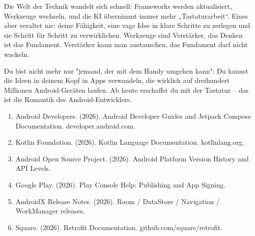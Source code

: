 Die Welt der Technik wandelt sich schnell: Frameworks werden aktualisiert, Werkzeuge wechseln, und die KI übernimmt immer mehr „Tastaturarbeit“. Eines aber veraltet nie: deine Fähigkeit, eine vage Idee in klare Schritte zu zerlegen und sie Schritt für Schritt zu verwirklichen. Werkzeuge sind Verstärker, das Denken ist das Fundament. Verstärker kann man austauschen, das Fundament darf nicht wackeln.

Du bist nicht mehr nur "jemand, der mit dem Handy umgehen kann": Du kannst die Ideen in deinem Kopf in Apps verwandeln, die wirklich auf dreihundert Millionen Android-Geräten laufen. Ab heute erschaffst du mit der Tastatur – das ist die Romantik des Android-Entwicklers.


\begin{enumerate}
  \item Android Developers. (2026). Android Developer Guides and Jetpack Compose Documentation. developer.android.com.
  \item Kotlin Foundation. (2026). Kotlin Language Documentation. kotlinlang.org.
  \item Android Open Source Project. (2026). Android Platform Version History and API Levels.
  \item Google Play. (2026). Play Console Help: Publishing and App Signing.
  \item AndroidX Release Notes. (2026). Room / DataStore / Navigation / WorkManager releases.
  \item Square. (2026). Retrofit Documentation. github.com/square/retrofit.
\end{enumerate}
